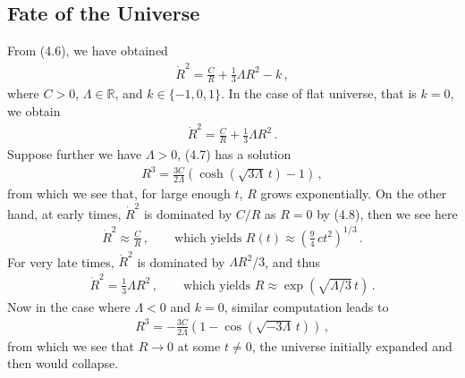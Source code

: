 \documentclass[11pt, onesided]{book}
\theoremstyle{break}
\theoremstyle{break}
\newcommand{\R}{\mathbb{R}}
\begin{document}
\subsection{Fate of the Universe}
From (4.6), we have obtained
\begin{align*}
\dot{R}^2 = \frac{C}{R} + \frac{1}{3}\Lambda R^2 - k\,,
\end{align*}
where $C>0$, $\Lambda \in \R$, and $k \in \{-1,0,1\}$. In the case of flat universe, that is $k = 0$, we obtain
\begin{align}
\dot{R}^2 = \frac{C}{R} + \frac{1}{3}\Lambda R^2\,.
\end{align}
Suppose further we have $\Lambda>0$, (4.7) has a solution
\begin{align}
R^3 = \frac{3C}{2\Lambda}\left( \cosh(\sqrt{3\Lambda}\, t) -1\right) \,,
\end{align}
from which we see that, for large enough $t$, $R$ grows exponentially. On the other hand, at early times, $\dot{R}^2$ is dominated by $C/R$ as $R = 0$ by (4.8), then we see here
\begin{align*}
\dot{R}^2 \approx \frac{C}{R}\,,\qquad \text{which yields }
R(t) \approx \left( \frac{9}{4}\, ct^2\right)^{1/3}\,.
\end{align*}
For very late times, $\dot{R}^2$ is dominated by $\Lambda R^2 /3$, and thus
\begin{align*}
\dot{R}^2 = \frac{1}{3}\Lambda R^2 \,,\qquad \text{which yields }
R\approx \exp\left( \sqrt{\Lambda/3 }\,t\right)\,.
\end{align*}
Now in the case where $\Lambda < 0$ and $k=0$, similar computation leads to
\begin{align}
R^3 = -\frac{3C}{2\Lambda}\left(1 - \cos(\sqrt{-3 \Lambda}\, t) \right)\,,
\end{align}
from which we see that $R \to 0$ at some $t \neq 0$, the universe initially expanded and then would collapse.\\
\end{document}
